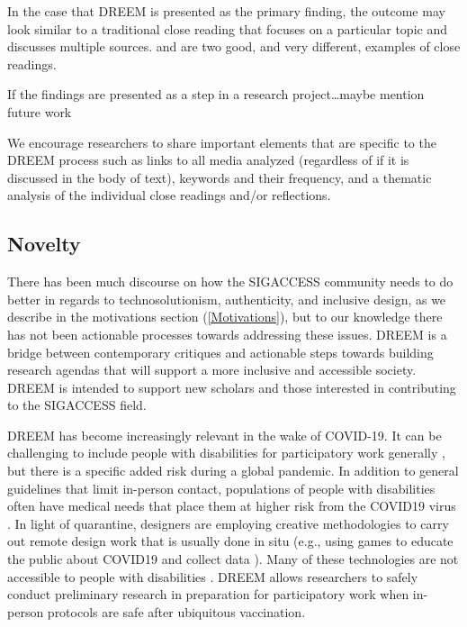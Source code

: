 In the case that DREEM is presented as the primary finding, the outcome may look similar to a traditional close reading that focuses on a particular topic and discusses multiple sources. \cite{cullenBetterWorldExamples} and \cite{mingusReflectingFridaKahlo2010} are two good, and very different, examples of close readings. 

If the findings are presented as a step in a research project{\color{red}\ldots maybe mention future work}

We encourage researchers to share important elements that are specific to the DREEM process such as links to all media analyzed (regardless of if it is discussed in the body of text), keywords and their frequency, and a thematic analysis of the individual close readings and/or reflections. 

\subsection{Novelty}
There has been much discourse on how the SIGACCESS community needs to do better in regards to technosolutionism, authenticity, and inclusive design, as we describe in the motivations section (\ref{Motivations}), but to our knowledge there has not been actionable processes towards addressing these issues. DREEM is a bridge between contemporary critiques and actionable steps towards building research agendas that will support a more inclusive and accessible society. DREEM is intended to support new scholars and those interested in contributing to the SIGACCESS field. 

DREEM has become increasingly relevant in the wake of COVID-19. It can be challenging to include people with disabilities for participatory work generally \cite{wardReflectionsParticipatoryAction2001}, but there is a specific added risk during a global pandemic. In addition to general guidelines that limit in-person contact, populations of people with disabilities often have medical needs that place them at higher risk from the COVID19 virus \cite{armitageCOVID19ResponseMust2020}. In light of quarantine, designers are employing creative methodologies to carry out remote design work that is usually done in situ \cite{whiteLearningCOVID19Design2020} (e.g., using games to educate the public about COVID19 and collect data \cite{lopezherna;ndezHealthcareGamificationSerious2020}). Many of these technologies are not accessible to people with disabilities \cite{annaswamyTelemedicineBarriersChallenges2020}. DREEM allows researchers to safely conduct preliminary research in preparation for participatory work when in-person protocols are safe after ubiquitous vaccination. 

